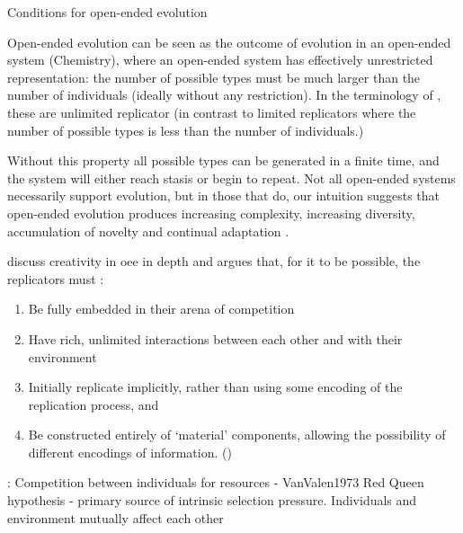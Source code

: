 
Conditions for open-ended evolution

Open-ended evolution can be seen as the outcome of evolution in an open-ended system (\eg Chemistry), where an open-ended system has effectively unrestricted representation: the number of possible types must be much larger than the number of individuals (ideally without any restriction). In the terminology of \cite{Szathmary:2006ty}, these are unlimited replicator (in contrast to limited replicators where the number of possible types is less than the number of individuals.)

Without this property all possible types can be generated in a finite time, and the system will either reach stasis or begin to repeat. Not all open-ended systems necessarily support evolution, but in those that do, our intuition suggests that open-ended evolution produces increasing complexity, increasing diversity, accumulation of novelty and continual adaptation \cite{Lehman2012}.


\Textcite{Taylor2001,Taylor:1999sc} discuss creativity in \gls{oee} in depth and argues that, for it to be possible, the replicators must \parencite{Hutton2004}:
\begin{enumerate}[label=\roman*] 
	\item Be fully embedded in their arena of competition 
	\item Have rich, unlimited interactions between each other and with their environment 
	\item Initially replicate implicitly, rather than using some encoding of the replication process, and 
	\item Be constructed entirely of `material' components, allowing the possibility of different encodings of information. ()
\end{enumerate}

\autocite{Taylor2001}:
Competition between individuals for resources - VanValen1973 Red Queen
hypothesis - primary source of intrinsic selection pressure.
Individuals and environment mutually affect each other

